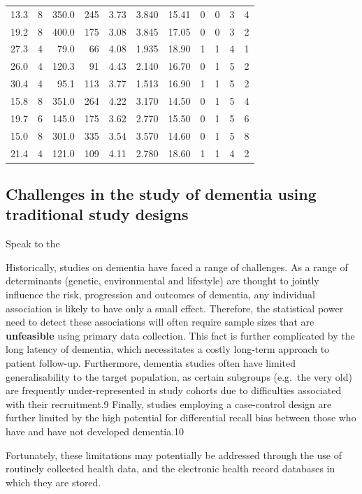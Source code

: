 \documentclass[a4paper, twoside]{templates/ociamthesis}
\begin{document}
\begin{longtable}{rrrrrrrrrrr}
13.3 & 8 & 350.0 & 245 & 3.73 & 3.840 & 15.41 & 0 & 0 & 3 & 4 \\ 
19.2 & 8 & 400.0 & 175 & 3.08 & 3.845 & 17.05 & 0 & 0 & 3 & 2 \\ 
27.3 & 4 & 79.0 & 66 & 4.08 & 1.935 & 18.90 & 1 & 1 & 4 & 1 \\ 
26.0 & 4 & 120.3 & 91 & 4.43 & 2.140 & 16.70 & 0 & 1 & 5 & 2 \\ 
30.4 & 4 & 95.1 & 113 & 3.77 & 1.513 & 16.90 & 1 & 1 & 5 & 2 \\ 
15.8 & 8 & 351.0 & 264 & 4.22 & 3.170 & 14.50 & 0 & 1 & 5 & 4 \\ 
19.7 & 6 & 145.0 & 175 & 3.62 & 2.770 & 15.50 & 0 & 1 & 5 & 6 \\ 
15.0 & 8 & 301.0 & 335 & 3.54 & 3.570 & 14.60 & 0 & 1 & 5 & 8 \\ 
21.4 & 4 & 121.0 & 109 & 4.11 & 2.780 & 18.60 & 1 & 1 & 4 & 2 \\ 
\bottomrule
\end{longtable}

\hypertarget{challenges-in-the-study-of-dementia-using-traditional-study-designs}{%
\subsection{Challenges in the study of dementia using traditional study designs}\label{challenges-in-the-study-of-dementia-using-traditional-study-designs}}

Speak to the

Historically, studies on dementia have faced a range of challenges. As a range of determinants (genetic, environmental and lifestyle) are thought to jointly influence the risk, progression and outcomes of dementia, any individual association is likely to have only a small effect. Therefore, the statistical power need to detect these associations will often require sample sizes that are \textbf{unfeasible} using primary data collection.
This fact is further complicated by the long latency of dementia, which necessitates a costly long-term approach to patient follow-up. Furthermore, dementia studies often have limited generalisability to the target population, as certain subgroups (e.g.~the very old) are frequently under-represented in study cohorts due to difficulties associated with their recruitment.9 Finally, studies employing a case-control design are further limited by the high potential for differential recall bias between those who have and have not developed dementia.10

Fortunately, these limitations may potentially be addressed through the use of routinely collected health data, and the electronic health record databases in which they are stored.
\end{document}
